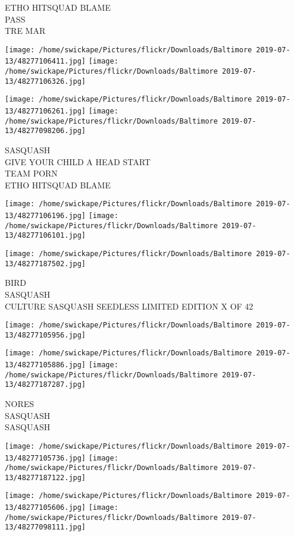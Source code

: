 \documentclass[10pt,letterpaper]{article}
\begin{document}
ETHO HITSQUAD BLAME\\
PASS\\
TRE MAR
\pagebreak

\texttt{[image: /home/swickape/Pictures/flickr/Downloads/Baltimore 2019-07-13/48277106411.jpg]}
\texttt{[image: /home/swickape/Pictures/flickr/Downloads/Baltimore 2019-07-13/48277106326.jpg]}

\texttt{[image: /home/swickape/Pictures/flickr/Downloads/Baltimore 2019-07-13/48277106261.jpg]}
\texttt{[image: /home/swickape/Pictures/flickr/Downloads/Baltimore 2019-07-13/48277098206.jpg]}

SASQUASH\\
GIVE YOUR CHILD A HEAD START\\
TEAM PORN\\
ETHO HITSQUAD BLAME
\pagebreak

\texttt{[image: /home/swickape/Pictures/flickr/Downloads/Baltimore 2019-07-13/48277106196.jpg]}
\texttt{[image: /home/swickape/Pictures/flickr/Downloads/Baltimore 2019-07-13/48277106101.jpg]}

\texttt{[image: /home/swickape/Pictures/flickr/Downloads/Baltimore 2019-07-13/48277187502.jpg]}

BIRD\\
SASQUASH\\
CULTURE SASQUASH SEEDLESS LIMITED EDITION X OF 42
\pagebreak

\texttt{[image: /home/swickape/Pictures/flickr/Downloads/Baltimore 2019-07-13/48277105956.jpg]}

\vspace{0.25in}
\texttt{[image: /home/swickape/Pictures/flickr/Downloads/Baltimore 2019-07-13/48277105886.jpg]}
\texttt{[image: /home/swickape/Pictures/flickr/Downloads/Baltimore 2019-07-13/48277187287.jpg]}

NORES\\
SASQUASH\\
SASQUASH
\pagebreak

\texttt{[image: /home/swickape/Pictures/flickr/Downloads/Baltimore 2019-07-13/48277105736.jpg]}
\texttt{[image: /home/swickape/Pictures/flickr/Downloads/Baltimore 2019-07-13/48277187122.jpg]}

\texttt{[image: /home/swickape/Pictures/flickr/Downloads/Baltimore 2019-07-13/48277105606.jpg]}
\texttt{[image: /home/swickape/Pictures/flickr/Downloads/Baltimore 2019-07-13/48277098111.jpg]}
\end{document}
